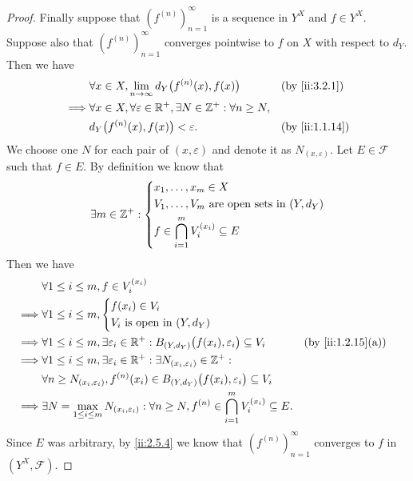 \begin{proof}
  Finally suppose that \((f^{(n)})_{n = 1}^\infty\) is a sequence in \(Y^X\) and \(f \in Y^X\).
  Suppose also that \((f^{(n)})_{n = 1}^\infty\) converges pointwise to \(f\) on \(X\) with respect to \(d_Y\).
  Then we have
  \begin{align*}
             & \forall x \in X, \lim_{n \to \infty} d_Y\big(f^{(n)}(x), f(x)\big)                    &  & \by{ii:3.2.1}  \\
    \implies & \forall x \in X, \forall \varepsilon \in \R^+, \exists N \in \Z^+ : \forall n \geq N,                     \\
             & d_Y\big(f^{(n)}(x), f(x)\big) < \varepsilon.                                          &  & \by{ii:1.1.14}
  \end{align*}
  We choose one \(N\) for each pair of \((x, \varepsilon)\) and denote it as \(N_{(x, \varepsilon)}\).
  Let \(E \in \mathcal{F}\) such that \(f \in E\).
  By definition we know that
  \[
    \exists m \in \mathbb{Z}^+ : \begin{dcases}
      x_1, \dots, x_m \in X                              \\
      V_1, \dots, V_m \text{ are open sets in } (Y, d_Y) \\
      f \in \bigcap_{i = 1}^m V_i^{(x_i)} \subseteq E
    \end{dcases}
  \]
  Then we have
  \begin{align*}
             & \forall 1 \leq i \leq m, f \in V_i^{(x_i)}                                                                                                                    \\
    \implies & \forall 1 \leq i \leq m, \begin{dcases}
                                          f(x_i) \in V_i \\
                                          V_i \text{ is open in } (Y, d_Y)
                                        \end{dcases}                                                                                                      \\
    \implies & \forall 1 \leq i \leq m, \exists \varepsilon_i \in \R^+ : B_{(Y, d_Y)}\big(f(x_i), \varepsilon_i\big) \subseteq V_i                    &  & \by{ii:1.2.15}[a] \\
    \implies & \forall 1 \leq i \leq m, \exists \varepsilon_i \in \R^+ : \exists N_{(x_i, \varepsilon_i)} \in \Z^+ :                                                         \\
             & \forall n \geq N_{(x_i, \varepsilon_i)}, f^{(n)}(x_i) \in B_{(Y, d_Y)}\big(f(x_i), \varepsilon_i\big) \subseteq V_i                                           \\
    \implies & \exists N = \max_{1 \leq i \leq m} N_{(x_i, \varepsilon_i)} : \forall n \geq N, f^{(n)} \in \bigcap_{i = 1}^m V_i^{(x_i)} \subseteq E.
  \end{align*}
  Since \(E\) was arbitrary, by \cref{ii:2.5.4} we know that \((f^{(n)})_{n = 1}^\infty\) converges to \(f\) in \((Y^X, \mathcal{F})\).
\end{proof}
